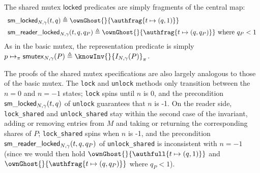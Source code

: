 The shared mutex $\mathsf{locked}$ predicates are simply fragments of the central map:
\[\begin{array}{l}
\smlocked{N, \gamma}{t}{q} \triangleq \ownGhost{}{\authfrag \{t \mapsto (q, 1)\}}\vspace{.5em}\\
\smreaderlocked{N, \gamma}{t}{q}{q_P} \triangleq \ownGhost{}{\authfrag \{t \mapsto (q, q_P)\}} \text{ where } q_P < 1
\end{array}\]
As in the basic mutex, the representation predicate is simply $p \mapsto_\pi \smutex{N, \gamma}{P} \triangleq \knowInv{}{I_{N, \gamma}(P)}_\pi$.

The proofs of the shared mutex specifications are also largely analogous to those of the basic mutex. The \lstinline{lock} and \lstinline{unlock} methods only transition between the $n = 0$ and $n = -1$ states; \lstinline{lock} spins until $n$ is 0, and the precondition $\mathsf{sm\_locked}_{N, \gamma}(t, q)$ of \lstinline{unlock} guarantees that $n$ is -1. On the reader side, \lstinline{lock_shared} and \lstinline{unlock_shared} stay within the second case of the invariant, adding or removing entries from $M$ and taking or returning the corresponding shares of $P$; \lstinline{lock_shared} spins when $n$ is -1, and the precondition $\mathsf{sm\_reader\_locked}_{N, \gamma}(t, q, q_P)$ of \lstinline{unlock_shared} is inconsistent with $n = -1$ (since we would then hold $\ownGhost{}{\authfull \{t \mapsto (q, 1)\}}$ and $\ownGhost{}{\authfrag \{t \mapsto (q, q_P)\}}$ where $q_P < 1$).
